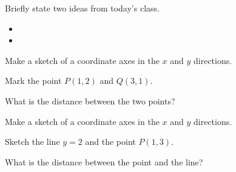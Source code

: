 \begin{problem}
\item Briefly state two ideas from today's class.
  \begin{itemize}
  \item
  \item
  \end{itemize}
\item
  \begin{subproblem}
    \item
  \end{subproblem}
\end{problem}


\begin{problem}
\item Make a sketch of a coordinate axes in the $x$ and $y$ directions.
  \vfill
\begin{subproblem}
  \item Mark the point $P(1,2)$ and $Q(3,1)$.
  \item What is the distance between the two points?
    \vspace{3em}
\end{subproblem}

\item Make a sketch of a coordinate axes in the $x$ and $y$ directions.
  \vfill
\begin{subproblem}
  \item Sketch the line $y=2$ and the point $P(1,3)$.
  \item What is the distance between the point and the line?
    \vspace{3em}
\end{subproblem}


\end{problem}


